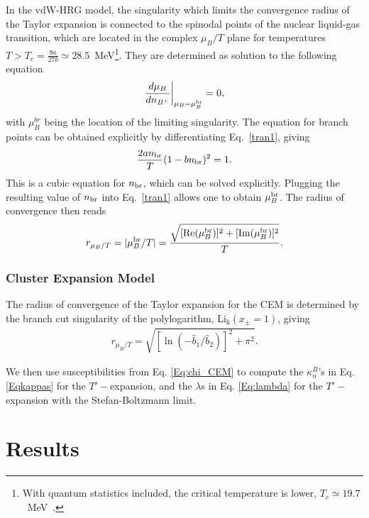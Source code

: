 \documentclass[%
 reprint,
nofootinbib,
 amsmath,amssymb,
 aps,
prc
]{revtex4-2}
\begin{document}
In the vdW-HRG model, the singularity which limits the convergence radius of the Taylor expansion is connected to the spinodal points of the nuclear liquid-gas transition, which are located in the complex $\mu_B/T$ plane for temperatures $T > T_c = \frac{8a}{27b} \simeq 28.5$~MeV\footnote{With quantum statistics included, the critical temperature is lower, $T_c \simeq 19.7$~MeV~\cite{Vovchenko:2015vxa}.}.
They are determined as solution to the following equation
\begin{align}
\frac{d\mu_B}{d n_{B^+}}\bigg|_{\mu_B = \mu_B^{\rm br}} = 0,
\label{Eq:dmuBdnB}
\end{align}
with $\mu_B^{br}$ being the location of the limiting singularity. 
The equation for branch points can be obtained explicitly by differentiating Eq.~\eqref{tran1}, giving~\cite{Savchuk:2019yxl}
\begin{align}
\frac{2a n_{\rm br}}{T} (1 - b n_{\rm br})^2 = 1.
\end{align}
This is a cubic equation for $n_{\rm br}$, which can be solved explicitly.
Plugging the resulting value of $n_{\rm br}$ into Eq.~\eqref{tran1} allows one to obtain $\mu_B^{\rm br}$.
The radius of convergence then reads
\begin{align}
   r_{\mu_B/T} = |\mu_B^{\rm br}/T| = \frac{\sqrt{[{\rm Re}(\mu_B^{\rm br})]^2 + [{\rm Im}(\mu_B^{\rm br})]^2}}{T}.
   \label{Eq:rmuBT}
\end{align}

\subsubsection{Cluster Expansion Model}
The radius of convergence of the Taylor expansion for the CEM is determined by the branch cut singularity of the polylogarithm, $\operatorname{Li_k}(x_\pm = 1)$, giving
\begin{align}
\label{eq:rmuTCEM}
    r_{\mu_B/T} = \sqrt{[\ln(-\hat{b}_1/\hat{b}_2)]^2 + \pi^2}.
\end{align}

We then use susceptibilities from Eq. \eqref{Eq:chi_CEM} to compute the $\kappa_n^B$'s in Eq. \eqref{Eqkappas} for the $T'-$expansion, and the $\lambda$s in Eq. \eqref{Eq:lambda} for the $T'-$expansion with the Stefan-Boltzmann limit. 


\section{\label{results}{Results}}
\end{document}

